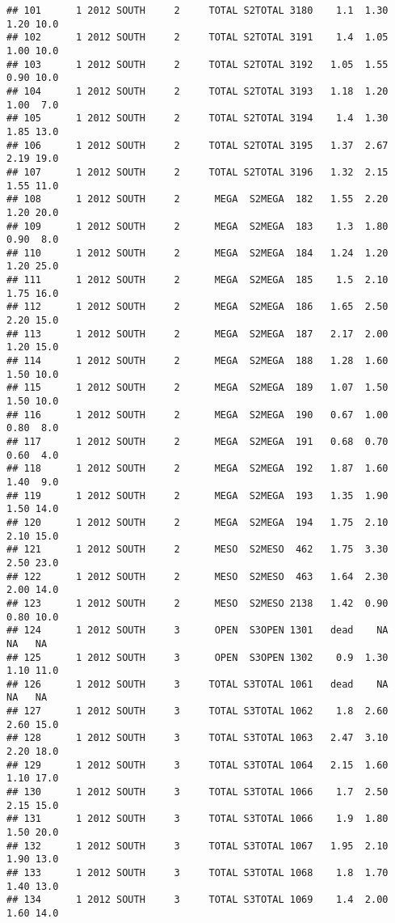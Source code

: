 \documentclass[
]{article}
\begin{document}
\begin{verbatim}
## 101      1 2012 SOUTH     2     TOTAL S2TOTAL 3180    1.1  1.30  1.20 10.0
## 102      1 2012 SOUTH     2     TOTAL S2TOTAL 3191    1.4  1.05  1.00 10.0
## 103      1 2012 SOUTH     2     TOTAL S2TOTAL 3192   1.05  1.55  0.90 10.0
## 104      1 2012 SOUTH     2     TOTAL S2TOTAL 3193   1.18  1.20  1.00  7.0
## 105      1 2012 SOUTH     2     TOTAL S2TOTAL 3194    1.4  1.30  1.85 13.0
## 106      1 2012 SOUTH     2     TOTAL S2TOTAL 3195   1.37  2.67  2.19 19.0
## 107      1 2012 SOUTH     2     TOTAL S2TOTAL 3196   1.32  2.15  1.55 11.0
## 108      1 2012 SOUTH     2      MEGA  S2MEGA  182   1.55  2.20  1.20 20.0
## 109      1 2012 SOUTH     2      MEGA  S2MEGA  183    1.3  1.80  0.90  8.0
## 110      1 2012 SOUTH     2      MEGA  S2MEGA  184   1.24  1.20  1.20 25.0
## 111      1 2012 SOUTH     2      MEGA  S2MEGA  185    1.5  2.10  1.75 16.0
## 112      1 2012 SOUTH     2      MEGA  S2MEGA  186   1.65  2.50  2.20 15.0
## 113      1 2012 SOUTH     2      MEGA  S2MEGA  187   2.17  2.00  1.20 15.0
## 114      1 2012 SOUTH     2      MEGA  S2MEGA  188   1.28  1.60  1.50 10.0
## 115      1 2012 SOUTH     2      MEGA  S2MEGA  189   1.07  1.50  1.50 10.0
## 116      1 2012 SOUTH     2      MEGA  S2MEGA  190   0.67  1.00  0.80  8.0
## 117      1 2012 SOUTH     2      MEGA  S2MEGA  191   0.68  0.70  0.60  4.0
## 118      1 2012 SOUTH     2      MEGA  S2MEGA  192   1.87  1.60  1.40  9.0
## 119      1 2012 SOUTH     2      MEGA  S2MEGA  193   1.35  1.90  1.50 14.0
## 120      1 2012 SOUTH     2      MEGA  S2MEGA  194   1.75  2.10  2.10 15.0
## 121      1 2012 SOUTH     2      MESO  S2MESO  462   1.75  3.30  2.50 23.0
## 122      1 2012 SOUTH     2      MESO  S2MESO  463   1.64  2.30  2.00 14.0
## 123      1 2012 SOUTH     2      MESO  S2MESO 2138   1.42  0.90  0.80 10.0
## 124      1 2012 SOUTH     3      OPEN  S3OPEN 1301   dead    NA    NA   NA
## 125      1 2012 SOUTH     3      OPEN  S3OPEN 1302    0.9  1.30  1.10 11.0
## 126      1 2012 SOUTH     3     TOTAL S3TOTAL 1061   dead    NA    NA   NA
## 127      1 2012 SOUTH     3     TOTAL S3TOTAL 1062    1.8  2.60  2.60 15.0
## 128      1 2012 SOUTH     3     TOTAL S3TOTAL 1063   2.47  3.10  2.20 18.0
## 129      1 2012 SOUTH     3     TOTAL S3TOTAL 1064   2.15  1.60  1.10 17.0
## 130      1 2012 SOUTH     3     TOTAL S3TOTAL 1066    1.7  2.50  2.15 15.0
## 131      1 2012 SOUTH     3     TOTAL S3TOTAL 1066    1.9  1.80  1.50 20.0
## 132      1 2012 SOUTH     3     TOTAL S3TOTAL 1067   1.95  2.10  1.90 13.0
## 133      1 2012 SOUTH     3     TOTAL S3TOTAL 1068    1.8  1.70  1.40 13.0
## 134      1 2012 SOUTH     3     TOTAL S3TOTAL 1069    1.4  2.00  1.60 14.0

\end{verbatim}
\end{document}

